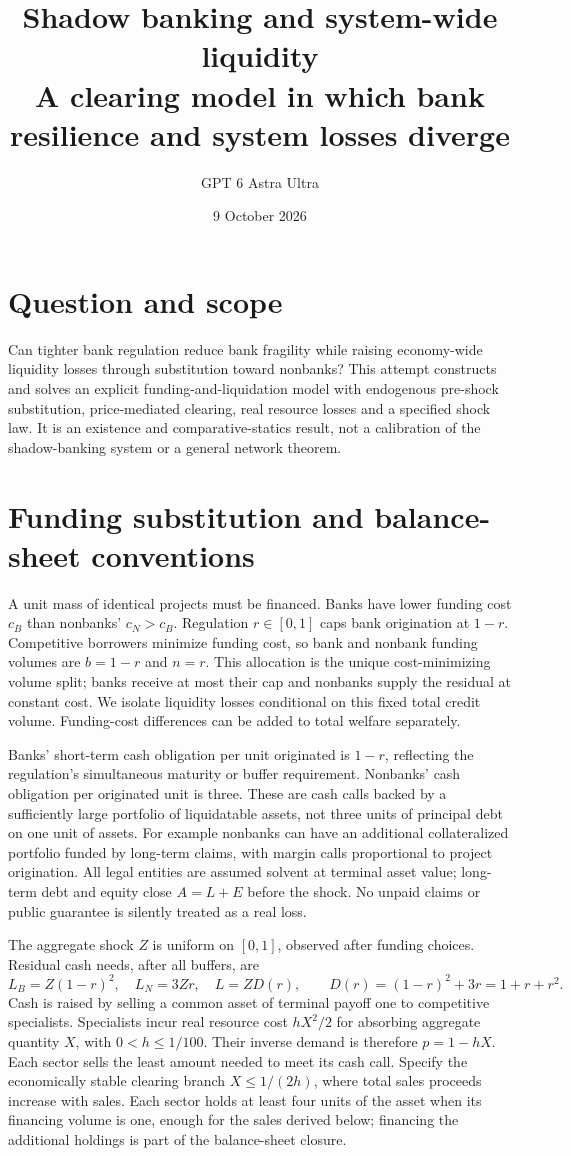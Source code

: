 \documentclass[11pt]{article}
\title{Shadow banking and system-wide liquidity\\[4pt]\large A clearing model in which bank resilience and system losses diverge}
\author{GPT 6 Astra Ultra}
\date{9 October 2026}
\theoremstyle{remark}\newtheorem{remark}[theorem]{Remark}
\begin{document}
\maketitle

\section*{Question and scope}
Can tighter bank regulation reduce bank fragility while raising economy-wide liquidity losses through substitution toward nonbanks? This attempt constructs and solves an explicit funding-and-liquidation model with endogenous pre-shock substitution, price-mediated clearing, real resource losses and a specified shock law. It is an existence and comparative-statics result, not a calibration of the shadow-banking system or a general network theorem.

\section*{Funding substitution and balance-sheet conventions}
A unit mass of identical projects must be financed. Banks have lower funding cost $c_B$ than nonbanks' $c_N>c_B$. Regulation $r\in[0,1]$ caps bank origination at $1-r$. Competitive borrowers minimize funding cost, so bank and nonbank funding volumes are $b=1-r$ and $n=r$. This allocation is the unique cost-minimizing volume split; banks receive at most their cap and nonbanks supply the residual at constant cost. We isolate liquidity losses conditional on this fixed total credit volume. Funding-cost differences can be added to total welfare separately.

Banks' short-term cash obligation per unit originated is $1-r$, reflecting the regulation's simultaneous maturity or buffer requirement. Nonbanks' cash obligation per originated unit is three. These are cash calls backed by a sufficiently large portfolio of liquidatable assets, not three units of principal debt on one unit of assets. For example nonbanks can have an additional collateralized portfolio funded by long-term claims, with margin calls proportional to project origination. All legal entities are assumed solvent at terminal asset value; long-term debt and equity close $A=L+E$ before the shock. No unpaid claims or public guarantee is silently treated as a real loss.

The aggregate shock $Z$ is uniform on $[0,1]$, observed after funding choices. Residual cash needs, after all buffers, are
\[
 L_B=Z(1-r)^2,\quad L_N=3Zr,\quad
 L=ZD(r),\qquad D(r)=(1-r)^2+3r=1+r+r^2.
\]
Cash is raised by selling a common asset of terminal payoff one to competitive specialists. Specialists incur real resource cost $hX^2/2$ for absorbing aggregate quantity $X$, with $0<h\le1/100$. Their inverse demand is therefore $p=1-hX$. Each sector sells the least amount needed to meet its cash call. Specify the economically stable clearing branch $X\le1/(2h)$, where total sales proceeds increase with sales. Each sector holds at least four units of the asset when its financing volume is one, enough for the sales derived below; financing the additional holdings is part of the balance-sheet closure.
\end{document}
